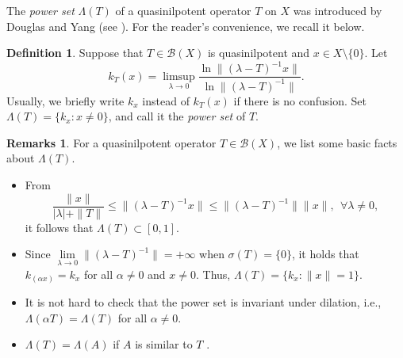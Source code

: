 \documentclass[12pt]{amsart}
\numberwithin{equation}{section}
\theoremstyle{plain}
\theoremstyle{definition}
\newtheorem{rems}[thm]{Remarks}
\newtheorem{defn}[thm]{Definition}
\newcommand{\B}{{\mathcal{B}}}
\begin{document}
The \emph{power set} $\Lambda(T)$ of a quasinilpotent operator $T$ on $X$ was introduced by  Douglas and Yang (see \cite{DY2,DY3}).
For the reader's convenience, we recall it below.
\begin{defn}
Suppose that $T\in\mathcal{B}(X)$ is quasinilpotent and $x\in X\setminus\{0\}$. Let
$$k_{T}(x)=\limsup\limits_{\lambda\rightarrow 0}\frac{\ln\|(\lambda-T)^{-1}x\|}{\ln\|(\lambda-T)^{-1}\|}.$$
Usually, we briefly write $k_x$ instead of $k_{T}(x)$ if there is no confusion.
Set $\Lambda(T)=\{k_x : x\ne 0\}$, and call it the {\em power set} of $T$.
\end{defn}
\begin{rems}
For a quasinilpotent operator $T\in\B(X)$, we list some basic facts about $\Lambda(T)$.
\end{rems}
\begin{itemize}
  \item [(1)] From
  $$\frac{\|x\|}{|\lambda|+\|T\|}\leq\|(\lambda-T)^{-1}x\|\leq\|(\lambda-T)^{-1}\|\|x\|,~~ \forall \lambda\ne 0,$$
  it follows that $\Lambda(T)\subset [0,1]$.
  \item [(2)]
  Since $\lim\limits_{\lambda\rightarrow 0}\|(\lambda-T)^{-1}\|=+\infty$ when $\sigma(T)=\{0\}$,
  it holds that $k_{(\alpha x)}=k_x$ for all $\alpha\ne 0$ and $x\ne 0$.
  Thus, $\Lambda(T)=\{k_x:\|x\|=1\}$.
  \item [(3)]
  It is not hard to check that the power set is invariant under dilation, i.e.,
  $\Lambda(\alpha T)=\Lambda(T)$ for all $\alpha\neq 0$.
  \item [(4)]
  $\Lambda(T)=\Lambda(A)$ if $A$ is similar to $T$ {\cite[Proposition 5.2]{DY3}}.
\end{itemize}
\end{document}
